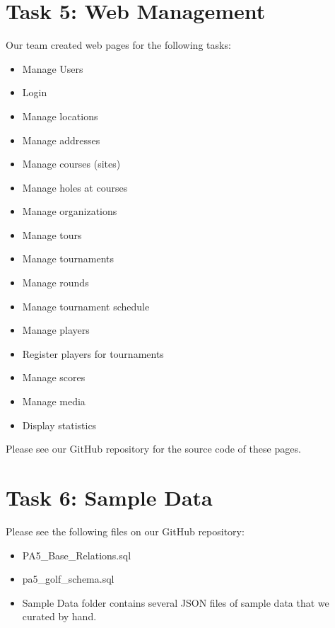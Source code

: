 \documentclass[titlepage]{article}
\begin{document}
\section{Task 5: Web Management}
\vspace{1em}
Our team created web pages for the following tasks:
\vspace{1em}
\begin{itemize}
	\item Manage Users
  \item Login 
  \item Manage locations 
	\item Manage addresses
	\item Manage courses (sites)
	\item Manage holes at courses
	\item Manage organizations 
	\item Manage tours
  \item Manage tournaments 
	\item Manage rounds
  \item Manage tournament schedule
	\item Manage players
	\item Register players for tournaments
	\item Manage scores
	\item Manage media
	\item Display statistics
\end{itemize}

Please see our GitHub repository for the source code of these pages.
\newpage


\section{Task 6: Sample Data}
\vspace{1em}
Please see the following files on our GitHub repository:
\vspace{1em}
\begin{itemize}
  \item PA5\_Base\_Relations.sql
  \item pa5\_golf\_schema.sql
  \item Sample Data folder contains several JSON files of sample data that we curated by hand.
\end{itemize}
\vspace{1em}
\end{document}
